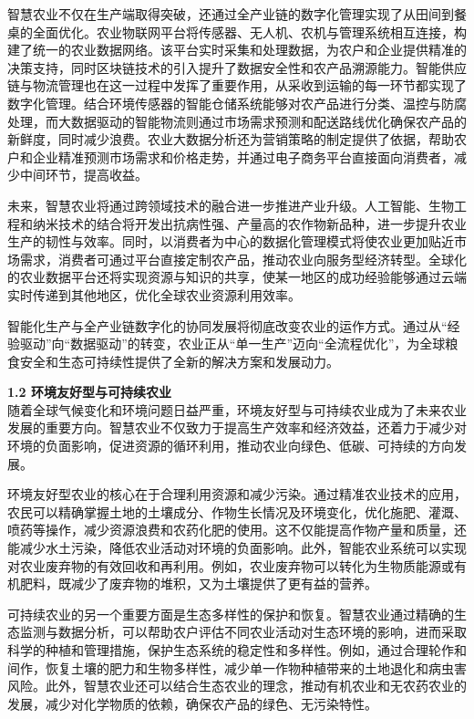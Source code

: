 智慧农业不仅在生产端取得突破，还通过全产业链的数字化管理实现了从田间到餐桌的全面优化。农业物联网平台将传感器、无人机、农机与管理系统相互连接，构建了统一的农业数据网络。该平台实时采集和处理数据，为农户和企业提供精准的决策支持，同时区块链技术的引入提升了数据安全性和农产品溯源能力。智能供应链与物流管理也在这一过程中发挥了重要作用，从采收到运输的每一环节都实现了数字化管理。结合环境传感器的智能仓储系统能够对农产品进行分类、温控与防腐处理，而大数据驱动的智能物流则通过市场需求预测和配送路线优化确保农产品的新鲜度，同时减少浪费。农业大数据分析还为营销策略的制定提供了依据，帮助农户和企业精准预测市场需求和价格走势，并通过电子商务平台直接面向消费者，减少中间环节，提高收益。  

未来，智慧农业将通过跨领域技术的融合进一步推进产业升级。人工智能、生物工程和纳米技术的结合将开发出抗病性强、产量高的农作物新品种，进一步提升农业生产的韧性与效率。同时，以消费者为中心的数据化管理模式将使农业更加贴近市场需求，消费者可通过平台直接定制农产品，推动农业向服务型经济转型。全球化的农业数据平台还将实现资源与知识的共享，使某一地区的成功经验能够通过云端实时传递到其他地区，优化全球农业资源利用效率。  

智能化生产与全产业链数字化的协同发展将彻底改变农业的运作方式。通过从“经验驱动”向“数据驱动”的转变，农业正从“单一生产”迈向“全流程优化”，为全球粮食安全和生态可持续性提供了全新的解决方案和发展动力。

\textbf{1.2 环境友好型与可持续农业} \\
随着全球气候变化和环境问题日益严重，环境友好型与可持续农业成为了未来农业发展的重要方向。智慧农业不仅致力于提高生产效率和经济效益，还着力于减少对环境的负面影响，促进资源的循环利用，推动农业向绿色、低碳、可持续的方向发展。

环境友好型农业的核心在于合理利用资源和减少污染。通过精准农业技术的应用，农民可以精确掌握土地的土壤成分、作物生长情况及环境变化，优化施肥、灌溉、喷药等操作，减少资源浪费和农药化肥的使用。这不仅能提高作物产量和质量，还能减少水土污染，降低农业活动对环境的负面影响。此外，智能农业系统可以实现对农业废弃物的有效回收和再利用。例如，农业废弃物可以转化为生物质能源或有机肥料，既减少了废弃物的堆积，又为土壤提供了更有益的营养。

可持续农业的另一个重要方面是生态多样性的保护和恢复。智慧农业通过精确的生态监测与数据分析，可以帮助农户评估不同农业活动对生态环境的影响，进而采取科学的种植和管理措施，保护生态系统的稳定性和多样性。例如，通过合理轮作和间作，恢复土壤的肥力和生物多样性，减少单一作物种植带来的土地退化和病虫害风险。此外，智慧农业还可以结合生态农业的理念，推动有机农业和无农药农业的发展，减少对化学物质的依赖，确保农产品的绿色、无污染特性。

